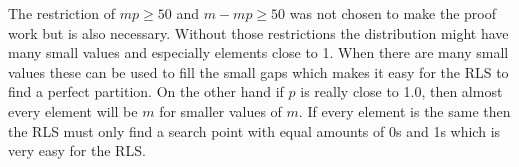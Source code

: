 The restriction of $mp\ge50$ and $m-mp\ge50$ was not chosen to make the proof work but is also necessary.
Without those restrictions the distribution might have many small values and especially elements close to 1.
When there are many small values these can be used to fill the small gaps which makes it easy for the RLS to find a perfect partition.
On the other hand if $p$ is really close to 1.0, then almost every element will be $m$ for smaller values of $m$.
If every element is the same then the RLS must only find a search point with equal amounts of 0s and 1s which is very easy for the RLS.